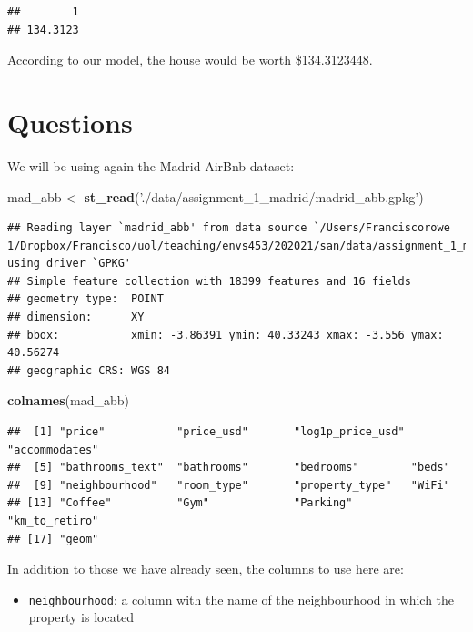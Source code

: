\documentclass[
]{book}
\newenvironment{Shaded}{\begin{snugshade}}{\end{snugshade}}
\newcommand{\KeywordTok}[1]{\textcolor[rgb]{0.13,0.29,0.53}{\textbf{#1}}}
\newcommand{\NormalTok}[1]{#1}
\newcommand{\StringTok}[1]{\textcolor[rgb]{0.31,0.60,0.02}{#1}}
\providecommand{\tightlist}{%
  \setlength{\itemsep}{0pt}\setlength{\parskip}{0pt}}
\begin{document}
\begin{verbatim}
##        1 
## 134.3123
\end{verbatim}

According to our model, the house would be worth \$134.3123448.

\hypertarget{questions-2}{%
\section{Questions}\label{questions-2}}

We will be using again the Madrid AirBnb dataset:

\begin{Shaded}
\begin{Highlighting}[]
\NormalTok{mad_abb <-}\StringTok{ }\KeywordTok{st_read}\NormalTok{(}\StringTok{'./data/assignment_1_madrid/madrid_abb.gpkg'}\NormalTok{)}
\end{Highlighting}
\end{Shaded}

\begin{verbatim}
## Reading layer `madrid_abb' from data source `/Users/Franciscorowe 1/Dropbox/Francisco/uol/teaching/envs453/202021/san/data/assignment_1_madrid/madrid_abb.gpkg' using driver `GPKG'
## Simple feature collection with 18399 features and 16 fields
## geometry type:  POINT
## dimension:      XY
## bbox:           xmin: -3.86391 ymin: 40.33243 xmax: -3.556 ymax: 40.56274
## geographic CRS: WGS 84
\end{verbatim}

\begin{Shaded}
\begin{Highlighting}[]
\KeywordTok{colnames}\NormalTok{(mad_abb)}
\end{Highlighting}
\end{Shaded}

\begin{verbatim}
##  [1] "price"           "price_usd"       "log1p_price_usd" "accommodates"   
##  [5] "bathrooms_text"  "bathrooms"       "bedrooms"        "beds"           
##  [9] "neighbourhood"   "room_type"       "property_type"   "WiFi"           
## [13] "Coffee"          "Gym"             "Parking"         "km_to_retiro"   
## [17] "geom"
\end{verbatim}

In addition to those we have already seen, the columns to use here are:

\begin{itemize}
\tightlist
\item
  \texttt{neighbourhood}: a column with the name of the neighbourhood in which the property is located
\end{itemize}
\end{document}

